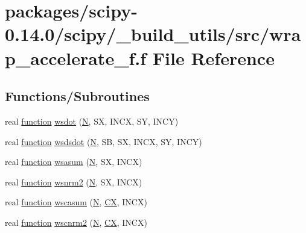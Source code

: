 \hypertarget{wrap__accelerate__f_8f}{}\section{packages/scipy-\/0.14.0/scipy/\+\_\+build\+\_\+utils/src/wrap\+\_\+accelerate\+\_\+f.f File Reference}
\label{wrap__accelerate__f_8f}
\subsection*{Functions/\+Subroutines}
\begin{DoxyCompactItemize}
\item 
real \hyperlink{afunc_8m_a7b5e596df91eadea6c537c0825e894a7}{function} \hyperlink{wrap__accelerate__f_8f_a1b9bea8bb64ba3df6b68f5a3bd335dd3}{wsdot} (\hyperlink{polmisc_8c_a0240ac851181b84ac374872dc5434ee4}{N}, S\+X, I\+N\+C\+X, S\+Y, I\+N\+C\+Y)
\item 
real \hyperlink{afunc_8m_a7b5e596df91eadea6c537c0825e894a7}{function} \hyperlink{wrap__accelerate__f_8f_aff7be3c1ed0bc89dd78a56568ad1c358}{wsdsdot} (\hyperlink{polmisc_8c_a0240ac851181b84ac374872dc5434ee4}{N}, S\+B, S\+X, I\+N\+C\+X, S\+Y, I\+N\+C\+Y)
\item 
real \hyperlink{afunc_8m_a7b5e596df91eadea6c537c0825e894a7}{function} \hyperlink{wrap__accelerate__f_8f_abc60eaafcfdb27c2f5ef726d8a9180e9}{wsasum} (\hyperlink{polmisc_8c_a0240ac851181b84ac374872dc5434ee4}{N}, S\+X, I\+N\+C\+X)
\item 
real \hyperlink{afunc_8m_a7b5e596df91eadea6c537c0825e894a7}{function} \hyperlink{wrap__accelerate__f_8f_a9dece8eb6e8208e78b365d485db1b2ef}{wsnrm2} (\hyperlink{polmisc_8c_a0240ac851181b84ac374872dc5434ee4}{N}, S\+X, I\+N\+C\+X)
\item 
real \hyperlink{afunc_8m_a7b5e596df91eadea6c537c0825e894a7}{function} \hyperlink{wrap__accelerate__f_8f_a8d09ac32537f600cd4d2c1426cb9c2c3}{wscasum} (\hyperlink{polmisc_8c_a0240ac851181b84ac374872dc5434ee4}{N}, \hyperlink{scsum1_8c_a5a76da95c549c41790389a76e12fdcb5}{C\+X}, I\+N\+C\+X)
\item 
real \hyperlink{afunc_8m_a7b5e596df91eadea6c537c0825e894a7}{function} \hyperlink{wrap__accelerate__f_8f_ad0461dd7ac977372fce478ead1ea96c2}{wscnrm2} (\hyperlink{polmisc_8c_a0240ac851181b84ac374872dc5434ee4}{N}, \hyperlink{scsum1_8c_a5a76da95c549c41790389a76e12fdcb5}{C\+X}, I\+N\+C\+X)

\end{DoxyCompactItemize}
